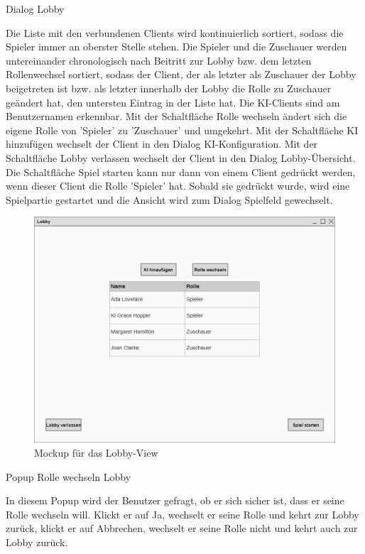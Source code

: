 Dialog \glqq{}Lobby\grqq{}

Die Liste mit den verbundenen Clients wird kontinuierlich sortiert, sodass die Spieler immer an oberster Stelle stehen. Die Spieler und die Zuschauer werden untereinander chronologisch nach Beitritt zur Lobby bzw. dem letzten Rollenwechsel sortiert, sodass der Client, der als letzter als Zuschauer der Lobby beigetreten ist bzw. als letzter innerhalb der Lobby die Rolle zu Zuschauer geändert hat, den untersten Eintrag in der Liste hat. Die KI-Clients sind am Benutzernamen erkennbar. 
Mit der Schaltfläche \glqq{}Rolle wechseln\grqq{} ändert sich die eigene Rolle von 'Spieler' zu 'Zuschauer' und umgekehrt. 
Mit der Schaltfläche \glqq{}KI hinzufügen\grqq{} wechselt der Client in den Dialog \glqq{}KI-Konfiguration\grqq{}.
Mit der Schaltfläche \glqq{}Lobby verlassen\grqq{} wechselt der Client in den Dialog \glqq{}Lobby-Übersicht\grqq{}.
Die Schaltfläche \glqq{}Spiel starten\grqq{} kann nur dann von einem Client gedrückt werden, wenn dieser Client die Rolle 'Spieler' hat. Sobald sie gedrückt wurde, wird eine Spielpartie gestartet und die Ansicht wird zum Dialog \glqq{}Spielfeld\grqq{} gewechselt.

\begin{figure}
  \centering
  \includegraphics[width=\textwidth]{Meilenstein03/Lobby_Mockup.png}
  \caption{Mockup für das Lobby-View}
\end{figure}

Popup \glqq{}Rolle wechseln Lobby\grqq{}

In diesem Popup wird der Benutzer gefragt, ob er sich sicher ist, dass er seine Rolle wechseln will. Klickt er auf Ja, wechselt er seine Rolle und kehrt zur Lobby zurück, klickt er auf Abbrechen, wechselt er seine Rolle nicht und kehrt auch zur Lobby zurück.

